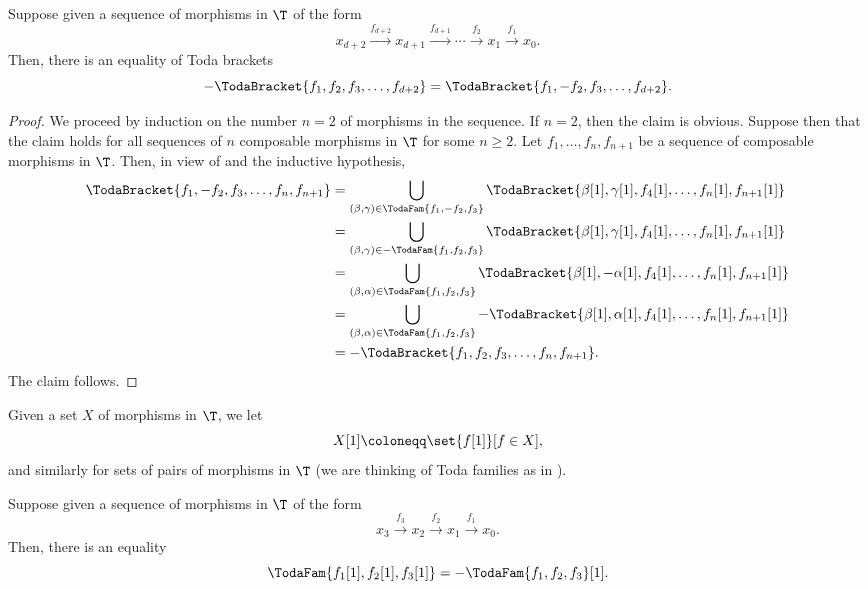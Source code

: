 \documentclass[a4paper]{amsart}
\begin{document}
\begin{lemma}
  \label{lemma:neg_TodaFam_f2}
  Suppose given a sequence of morphisms in $\T$ of the form
  \[
    x_{d+2}\xrightarrow{f_{d+2}}x_{d+1}\xrightarrow{f_{d+1}}\cdots\xrightarrow{f_2}x_1\xrightarrow{f_1}x_0.
  \]
  Then, there is an equality of Toda brackets
  \[
    -\TodaBracket{f_1,f_2,f_3,\dots,f_{d+2}}=\TodaBracket{f_1,-f_2,f_3,\dots,f_{d+2}}.
  \]
\end{lemma}
\begin{proof}
  We proceed by induction on the number $n=2$ of morphisms in the sequence. If
  $n=2$, then the claim is obvious. Suppose then that the claim holds for all
  sequences of $n$ composable morphisms in $\T$ for some $n\geq2$. Let
  $f_1,\dots,f_n,f_{n+1}$ be a sequence of composable morphisms in $\T$. Then,
  in view of  and the inductive hypothesis,
  \begin{align*}
    \TodaBracket{f_1,-f_2,f_3,\dots,f_n,f_{n+1}} & =\bigcup_{(\beta,\gamma)\in\TodaFam{f_1,-f_2,f_3}}\TodaBracket{\beta[1],\gamma[1],f_4[1],\dots,f_n[1],f_{n+1}[1]} \\
                                                 & =\bigcup_{(\beta,\gamma)\in-\TodaFam{f_1,f_2,f_3}}\TodaBracket{\beta[1],\gamma[1],f_4[1],\dots,f_n[1],f_{n+1}[1]} \\
                                                 & =\bigcup_{(\beta,\alpha)\in\TodaFam{f_1,f_2,f_3}}\TodaBracket{\beta[1],-\alpha[1],f_4[1],\dots,f_n[1],f_{n+1}[1]} \\
                                                 & =\bigcup_{(\beta,\alpha)\in\TodaFam{f_1,f_2,f_3}}-\TodaBracket{\beta[1],\alpha[1],f_4[1],\dots,f_n[1],f_{n+1}[1]} \\
                                                 & =-\TodaBracket{f_1,f_2,f_3,\dots,f_n,f_{n+1}}.
  \end{align*}
  The claim follows.
\end{proof}

\begin{notation}
  Given a set $X$ of morphisms in $\T$, we let
  \[
    X[1]\coloneqq\set{f[1]}[f\in X],
  \]
  and similarly for sets of pairs of morphisms in $\T$ (we are thinking of Toda
  families as in ).
\end{notation}

\begin{lemma}[{\cite[Lemma~5.12]{CF17}}]
  \label{lemma:neg_TodaFam_shift}
  Suppose given a sequence of morphisms in $\T$ of the form
  \[
    x_3\xrightarrow{f_3}x_2\xrightarrow{f_2}x_1\xrightarrow{f_1}x_0.
  \]
  Then, there is an equality
  \[
    \TodaFam{f_1[1],f_2[1],f_3[1]}=-\TodaFam{f_1,f_2,f_3}[1].
  \]
\end{lemma}
\end{document}
